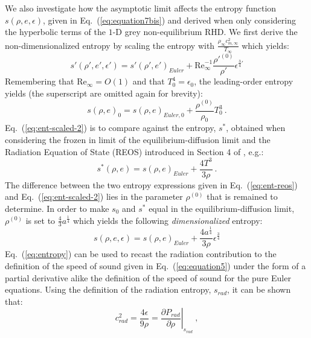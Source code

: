\documentclass[review]{elsarticle}
\newcommand{\eqt}[1]{Eq.~(\ref{#1})}                     %
\renewcommand{\Re}{\textrm{Re}}
\begin{document}
We also investigate how the asymptotic limit affects the entropy function $s(\rho, e, \epsilon)$, given in \eqt{eq:equation7bis} and derived when only considering the hyperbolic terms of the $1$-D grey non-equilibrium RHD. We first derive the non-dimensionalized entropy by scaling the entropy with $\frac{\rho_\infty c_{m,\infty}^2}{T_\infty}$ which yields:
%
\begin{equation}\label{eq:ent-scaled}
s' \left( \rho', e', \epsilon' \right) = s'\left( \rho', e' \right)_{Euler} + \Re_\infty^{-1} \frac{\rho'^{(0)}}{\rho'} \epsilon^{\frac{3}{4}'}
\end{equation}
%
Remembering that $\Re_\infty = O(1)$ and that $T_0^4 = \epsilon_0$, the leading-order entropy yields (the superscript are omitted again for brevity):
%
\begin{equation}\label{eq:ent-scaled-2}
s \left( \rho, e \right)_0 = s\left( \rho, e \right)_{Euler,0} + \frac{\rho^{(0)}}{\rho_0} T_0^3 \ .
\end{equation}
%
\eqt{eq:ent-scaled-2} is to compare against the entropy, $s^*$, obtained when considering the frozen in limit of the equilibrium-diffusion limit and the Radiation Equation of State (REOS) introduced in Section 4 of \cite{LowrieMorel}, e.g.:
%
\begin{equation}\label{eq:ent-reos}
s^*(\rho,e) = s(\rho,e)_{Euler} + \frac{4T^3}{3\rho} \ .
\end{equation}
%
The difference between the two entropy expressions given in \eqt{eq:ent-reos} and \eqt{eq:ent-scaled-2} lies in the parameter $\rho^{(0)}$ that is remained to determine. In order to make $s_0$ and $s^*$ equal in the equilibrium-diffusion limit, $\rho^{(0)}$ is set to $\frac{4}{3}a^\frac{1}{4}$ which yields the following \emph{dimensionalized} entropy:
%
\begin{equation}\label{eq:entropy}
s \left( \rho, e, \epsilon \right) = s\left( \rho, e \right)_{Euler} + \frac{4a^\frac{1}{4}}{3\rho} \epsilon^\frac{3}{4}
\end{equation}
%
\eqt{eq:entropy} can be used to recast the radiation contribution to the definition of the speed of sound given in \eqt{eq:equation5} under the form of a partial derivative alike the definition of the speed of sound for the pure Euler equations. Using the definition of the radiation entropy, $s_{rad}$, it can be shown that:
%
\begin{equation}\label{eq:sp-sd-rad}
c^2_{rad} = \frac{4 \epsilon}{9 \rho} = \left. \frac{\partial P_{rad}}{\partial \rho}\right|_{s_{rad}} \ ,
\end{equation}
\end{document}
